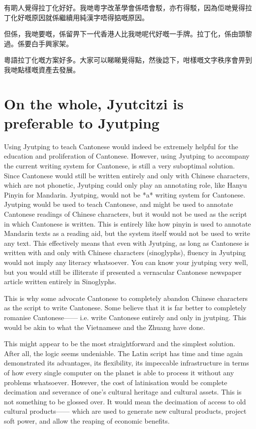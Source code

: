 有啲人覺得拉丁化好好。我哋粵字改革學會係唔會駁，亦冇得駁，因為佢哋覺得拉丁化好嘅原因就係繼續用純漢字唔得掂嘅原因。

但係，我哋要嘅，係留畀下一代香港人比我哋呢代好嘅一手牌。拉丁化，係由頭黎過。係要白手興家架。

粵語拉丁化嘅方案好多。大家可以睇睇覺得點，然後諗下，咁樣嘅文字秩序會畀到我哋點樣嘅資產去發展。



\section{On the whole, Jyutcitzi is preferable to Jyutping}


Using Jyutping to teach Cantonese would indeed be extremely helpful for the education and proliferation of Cantonese. However, using Jyutping to accompany the current writing system for Cantonese, is still a very suboptimal solution. Since Cantonese would still be written entirely and only with Chinese characters, which are not phonetic, Jyutping could only play an annotating role, like Hanyu Pinyin for Mandarin. Jyutping, would not be *a* writing system for Cantonese. Jyutping would be used to teach Cantonese, and might be used to annotate Cantonese readings of Chinese characters, but it would not be used as the script in which Cantonese is written. This is entirely like how pinyin is used to annotate Mandarin texts as a reading aid, but the system itself would not be used to write any text. This effectively means that even with Jyutping, as long as Cantonese is written with and only with Chinese characters (sinoglyphs), fluency in Jyutping would not imply any literacy whatsoever. You can know your jyutping very well, but you would still be illiterate if presented a vernacular Cantonese newspaper article written entirely in Sinoglyphs.

This is why some advocate Cantonese to completely abandon Chinese characters as the script to write Cantonese. Some believe that it is far better to completely romanise Cantonese—— i.e. write Cantonese entirely and only in jyutping. This would be akin to what the Vietnamese and the Zhuang have done.

This might appear to be the most straightforward and the simplest solution. After all, the logic seems undeniable. The Latin script has time and time again demonstrated its advantages, its flexibility, its impeccable infrastructure in terms of how every single computer on the planet is able to process it without any problems whatsoever. However, the cost of latinisation would be complete decimation and severance of one’s cultural heritage and cultural assets. This is not something to be glossed over. It would mean the decimation of access to old cultural products—— which are used to generate new cultural products, project soft power, and allow the reaping of economic benefits.

